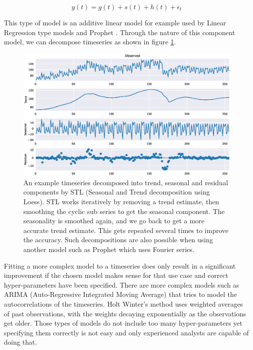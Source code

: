\begin{equation}
    y(t)=g(t)+s(t)+h(t)+\epsilon_t
    \label{eq:fullTrendModel}
\end{equation}

This type of model is an additive linear model for example used by Linear Regression type models and Prophet \cite{prophet}. Through the nature of this component model, we can decompose timeseries as shown in figure \ref{fig:stl-decomposition}.


\begin{figure}
\centerline{\includegraphics[scale=.6]{Figures/stl.eps}}
\caption{An example timeseries decomposed into trend, seasonal and residual components by STL \cite{STL} (Seasonal and Trend decomposition using Loess). STL works iteratively by removing a trend estimate, then smoothing the cyclic sub series to get the seasonal component. The seasonality is smoothed again, and we go back to get a more accurate trend estimate. This gets repeated several times to improve the accuracy. Such decompositions are also possible when using another model such as Prophet which uses Fourier series.}
\label{fig:stl-decomposition}
\end{figure}

Fitting a more complex model to a timeseries does only result in a significant improvement if the chosen model makes sense for that use case and correct hyper-parameters have been specified. There are more complex models such as ARIMA \cite{ARIMA} (Auto-Regressive Integrated Moving Average) that tries to model the autocorrelations of the timeseries. Holt Winter's method \cite{HOLT} uses weighted averages of past observations, with the weights decaying exponentially as the observations get older. 
Those types of models do not include too many hyper-parameters yet specifying them correctly is not easy and only experienced analysts are capable of doing that.

